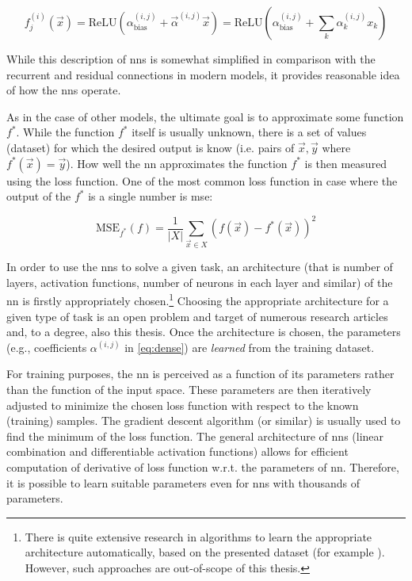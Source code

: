 \begin{equation}
    \label{eq:dense}
    f^{(i)}_j(\vec{x}) = \mathrm{ReLU}\left(\alpha_{\mathrm{bias}}^{(i,j)} + \vec{\alpha}^{(i,j)} \vec{x}\right) = \mathrm{ReLU}\left(\alpha_{\mathrm{bias}}^{(i,j)} + \sum_{k}\alpha_k^{(i,j)}x_k\right)
\end{equation}

While this description of \glspl{nn} is somewhat simplified in comparison with the recurrent and residual connections in modern models, it provides reasonable idea of how the \glspl{nn} operate.

As in the case of other  models, the ultimate goal is to approximate some function $f^*$. While the function $f^*$ itself is usually unknown, there is a set of values (dataset) for which the desired output is know (i.e. pairs of $\vec{x}, \vec{y}$ where $f^*(\vec{x}) = \vec{y}$). How well the \gls{nn} approximates the function $f^*$ is then measured using the loss function. One of the most common loss function in case where the output of the $f^*$ is a single number is \gls{mse}:

$$\text{MSE}_{f^*}(f) = \frac{1}{|X|} \sum_{\vec{x} \in X} (f(\vec{x}) - f^*(\vec{x}))^2$$

In order to use the \glspl{nn} to solve a given task, an architecture (that is number of layers, activation functions, number of neurons in each layer and similar) of the \gls{nn} is firstly appropriately chosen.\footnote{There is quite extensive research in algorithms to learn the appropriate architecture automatically, based on the presented dataset (for example \cite{neat}). However, such approaches are out-of-scope of this thesis.} Choosing the appropriate architecture for a given type of task is an open problem and target of numerous research articles and, to a degree, also this thesis. Once the architecture is chosen, the parameters (e.g., coefficients $\alpha^{(i,j)}$ in \autoref{eq:dense}) are \emph{learned} from the training dataset.

For training purposes, the \gls{nn} is perceived as a function of its parameters rather than the function of the input space. These parameters are then iteratively adjusted to minimize the chosen loss function with respect to the known (training) samples. The gradient descent algorithm (or similar) is usually used to find the minimum of the loss function. The general architecture of \glspl{nn} (linear combination and differentiable activation functions) allows for efficient computation of derivative of loss function w.r.t. the parameters of \gls{nn}. Therefore, it is possible to learn suitable parameters even for \glspl{nn} with thousands of parameters.

